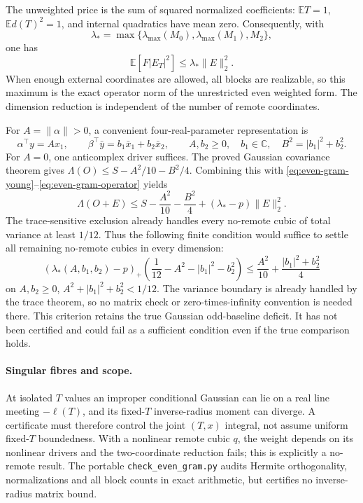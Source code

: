 The unweighted price is the sum of squared normalized coefficients:
$\mathbb ET=1$, $\mathbb Ed(T)^2=1$, and internal quadratics have mean
zero. Consequently, with
\[
\lambda_* =\max\{\lambda_{\max}(M_0),\lambda_{\max}(M_1),M_2\},
\]
one has
\begin{equation}
\mathbb E[F|E_T|^2]\le\lambda_*\|E\|_2^2.
\label{eq:even-gram-operator}
\end{equation}
When enough external coordinates are allowed, all blocks are realizable,
so this maximum is the exact operator norm of the unrestricted even
weighted form. The dimension reduction is independent of the number of
remote coordinates.

For $A=\|\alpha\|>0$, a convenient four-real-parameter representation is
\[
\alpha^\top y=Ax_1,\qquad
\beta^\top\bar y=b_1\bar x_1+b_2\bar x_2,
\qquad A,b_2\ge0,\quad b_1\in\mathbb C,
\quad B^2=|b_1|^2+b_2^2.
\]
For $A=0$, one anticomplex driver suffices. The proved Gaussian
covariance theorem gives
$\Lambda(O)\le S-A^2/10-B^2/4$. Combining this with
\eqref{eq:even-gram-young}--\eqref{eq:even-gram-operator} yields
\[
\Lambda(O+E)\le S-\frac{A^2}{10}-\frac{B^2}{4}
+(\lambda_*-p)\|E\|_2^2.
\]
The trace-sensitive exclusion already handles every no-remote cubic of
total variance at least $1/12$. Thus the following finite condition
would suffice to settle all remaining no-remote cubics in every dimension:
\begin{equation}
\boxed{(\lambda_*(A,b_1,b_2)-p)_+
\left(\frac1{12}-A^2-|b_1|^2-b_2^2\right)
\le\frac{A^2}{10}+\frac{|b_1|^2+b_2^2}{4}}
\label{eq:even-gram-target}
\end{equation}
on $A,b_2\ge0$, $A^2+|b_1|^2+b_2^2<1/12$. The variance boundary is already handled by the trace theorem, so no matrix check or zero-times-infinity convention is needed there.
This criterion retains the true Gaussian odd-baseline deficit. It has
not been certified and could fail as a sufficient condition even if
the true comparison holds.

\paragraph{Singular fibres and scope.}
At isolated $T$ values an improper conditional Gaussian can lie on a
real line meeting $-\ell(T)$, and its fixed-$T$ inverse-radius moment
can diverge. A certificate must therefore control the joint $(T,x)$
integral, not assume uniform fixed-$T$ boundedness. With a nonlinear
remote cubic $q$, the weight depends on its nonlinear drivers and the
two-coordinate reduction fails; this is explicitly a no-remote result.
The portable \texttt{check\_even\_gram.py} audits Hermite orthogonality,
normalizations and all block counts in exact arithmetic, but certifies
no inverse-radius matrix bound.

